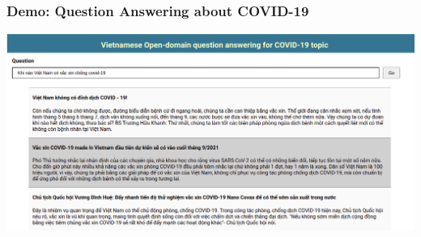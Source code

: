 \documentclass[11pt]{beamer}
\renewcommand{\raggedright}{\leftskip=0pt \rightskip=0pt plus 0cm}
\let\olditemize=\itemize
\renewenvironment{itemize}{\olditemize\raggedright}{\endlist}
\begin{document}
\begin{frame}
\frametitle{Demo: Question Answering about COVID-19}
\begin{adjustwidth}{-2em}{-2em}
	\includegraphics[scale=.27]{images/VNQA_2.png}
\end{adjustwidth}
\end{frame}
\end{document}
